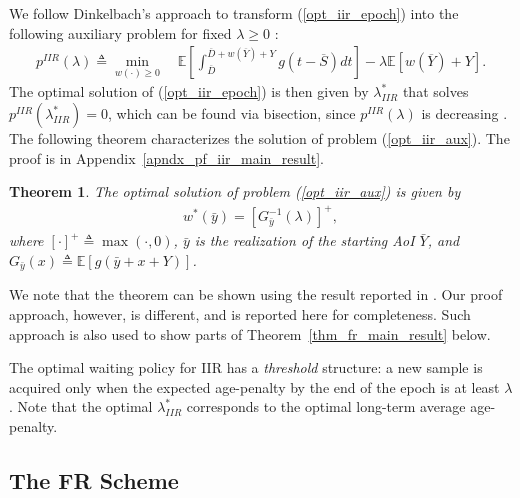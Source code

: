 \documentclass[12pt,journal,onecolumn]{IEEEtran}
\newtheorem{theorem}{Theorem}
\begin{document}
We follow Dinkelbach's approach to transform (\ref{opt_iir_epoch}) into the following auxiliary problem for fixed $\lambda\geq0$ \cite{dinkelbach-fractional-prog}:
\begin{align} \label{opt_iir_aux}
p^{IIR}(\lambda)\triangleq\min_{w(\cdot)\geq0}\quad\mathbb{E}\left[\int_{\overline{D}}^{\overline{D}+w\left(\overline{Y}\right)+Y}g\left(t-\overline{S}\right)dt\right] -\lambda\mathbb{E}\left[w\left(\overline{Y}\right)+Y\right].
\end{align}
The optimal solution of (\ref{opt_iir_epoch}) is then given by $\lambda^*_{IIR}$ that solves $p^{IIR}(\lambda^*_{IIR})=0$, which can be found via bisection, since $p^{IIR}(\lambda)$ is decreasing \cite{dinkelbach-fractional-prog}. The following theorem characterizes the solution of problem (\ref{opt_iir_aux}). The proof is in Appendix~\ref{apndx_pf_iir_main_result}.

\begin{theorem} \label{thm_iir_main_result}
The optimal solution of problem (\ref{opt_iir_aux}) is given by
\begin{align}
w^*(\bar{y})=\left[G_{\bar{y}}^{-1}(\lambda)\right]^+,
\end{align}
where $\left[\cdot\right]^+\triangleq\max(\cdot,0)$, $\bar{y}$ is the realization of the starting AoI $\bar{Y}$, and $G_{\bar{y}}(x)\triangleq\mathbb{E}\left[g\left(\bar{y}+x+Y\right)\right]$.
\end{theorem}

We note that the theorem can be shown using the result reported in \cite[Theorem~1]{sun-cyr-aoi-non-linear}. Our proof approach, however, is different, and is reported here for completeness. Such approach is also used to show parts of Theorem~\ref{thm_fr_main_result} below.

The optimal waiting policy for IIR has a {\it threshold} structure: a new sample is acquired only when the expected age-penalty by the end of the epoch is at least $\lambda$. Note that the optimal $\lambda^*_{IIR}$ corresponds to the optimal long-term average age-penalty.


\subsection{The FR Scheme}
\end{document}
